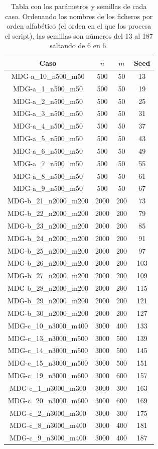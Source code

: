 \documentclass{article}
\begin{document}
\begin{table}[H]
	\centering
	\begin{tabular}{|cccc|}
		\hline
		Caso & $n$ & $m$ & Seed\\ \hline
		MDG-a\_10\_n500\_m50 & 500 & 50 & 13\\
		MDG-a\_1\_n500\_m50 & 500 & 50 & 19\\
		MDG-a\_2\_n500\_m50 & 500 & 50 & 25\\
		MDG-a\_3\_n500\_m50 & 500 & 50 & 31\\
		MDG-a\_4\_n500\_m50 & 500 & 50 & 37\\
		MDG-a\_5\_n500\_m50 & 500 & 50 & 43\\
		MDG-a\_6\_n500\_m50 & 500 & 50 & 49\\
		MDG-a\_7\_n500\_m50 & 500 & 50 & 55\\
		MDG-a\_8\_n500\_m50 & 500 & 50 & 61\\
		MDG-a\_9\_n500\_m50 & 500 & 50 & 67\\
		MDG-b\_21\_n2000\_m200 & 2000 & 200 & 73\\
		MDG-b\_22\_n2000\_m200 & 2000 & 200 & 79\\
		MDG-b\_23\_n2000\_m200 & 2000 & 200 & 85\\
		MDG-b\_24\_n2000\_m200 & 2000 & 200 & 91\\
		MDG-b\_25\_n2000\_m200 & 2000 & 200 & 97\\
		MDG-b\_26\_n2000\_m200 & 2000 & 200 & 103\\
		MDG-b\_27\_n2000\_m200 & 2000 & 200 & 109\\
		MDG-b\_28\_n2000\_m200 & 2000 & 200 & 115\\
		MDG-b\_29\_n2000\_m200 & 2000 & 200 & 121\\
		MDG-b\_30\_n2000\_m200 & 2000 & 200 & 127\\
		MDG-c\_10\_n3000\_m400 & 3000 & 400 & 133\\
		MDG-c\_13\_n3000\_m500 & 3000 & 500 & 139\\
		MDG-c\_14\_n3000\_m500 & 3000 & 500 & 145\\
		MDG-c\_15\_n3000\_m500 & 3000 & 500 & 151\\
		MDG-c\_19\_n3000\_m600 & 3000 & 600 & 157\\
		MDG-c\_1\_n3000\_m300 & 3000 & 300 & 163\\
		MDG-c\_20\_n3000\_m600 & 3000 & 600 & 169\\
		MDG-c\_2\_n3000\_m300 & 3000 & 300 & 175\\
		MDG-c\_8\_n3000\_m400 & 3000 & 400 & 181\\
		MDG-c\_9\_n3000\_m400 & 3000 & 400 & 187\\
		\hline
	\end{tabular}
\caption{Tabla con los parámetros y semillas de cada caso. Ordenando los nombres de los ficheros por orden alfabético
(el orden en el que los procesa el script), las semillas son números del 13 al 187 saltando de 6 en 6.}
\label{tab:param-seed}
\end{table}
\end{document}
